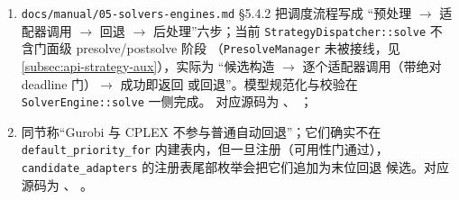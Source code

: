 \begin{enumerate}
  \item \texttt{docs/manual/05-solvers-engines.md} \S 5.4.2 把调度流程写成
        ``预处理 $\to$ 适配器调用 $\to$ 回退 $\to$ 后处理''六步；当前
        \texttt{StrategyDispatcher::solve} 不含门面级 presolve/postsolve 阶段
        （\texttt{PresolveManager} 未被接线，见
        \ref{subsec:api-strategy-aux}），实际为
        ``候选构造 $\to$ 逐个适配器调用（带绝对 deadline 门）$\to$ 成功即返回
        或回退''。模型规范化与校验在 \texttt{SolverEngine::solve} 一侧完成。
        对应源码为
        、
        ；
  \item 同节称``Gurobi 与 CPLEX 不参与普通自动回退''；它们确实不在
        \texttt{default\_priority\_for} 内建表内，但一旦注册（可用性门通过），
        \texttt{candidate\_adapters} 的注册表尾部枚举会把它们追加为末位回退
        候选。对应源码为
        、
        。
\end{enumerate}
